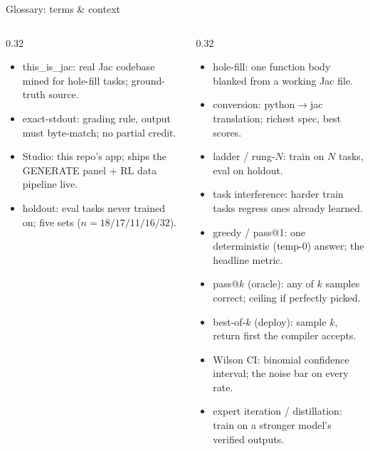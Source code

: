 \documentclass[aspectratio=169,10pt]{beamer}
\newcommand{\term}[1]{\textcolor{jasecidark}{#1}}
\begin{document}
\begin{frame}[t]{Glossary: terms \& context}
\begin{columns}[T]
\begin{column}{0.32\textwidth}
\begin{itemize}
        \item \term{this\_is\_jac}: real Jac codebase mined for hole-fill tasks; ground-truth source.
        \item \term{exact-stdout}: grading rule, output must byte-match; no partial credit.
        \item \term{Studio}: this repo's app; ships the GENERATE panel + RL data pipeline live.
        \item \term{holdout}: eval tasks never trained on; five sets ($n{=}18/17/11/16/32$).
      \end{itemize}
    \end{column}
    \begin{column}{0.32\textwidth}
      \begin{itemize}\itemsep0.15em
        \item \term{hole-fill}: one function body blanked from a working Jac file.
        \item \term{conversion}: python$\rightarrow$jac translation; richest spec, best scores.
        \item \term{ladder / rung-$N$}: train on $N$ tasks, eval on holdout.
        \item \term{task interference}: harder train tasks regress ones already learned.
        \item \term{greedy / pass@1}: one deterministic (temp-0) answer; the headline metric.
        \item \term{pass@$k$ (oracle)}: any of $k$ samples correct; ceiling if perfectly picked.
        \item \term{best-of-$k$ (deploy)}: sample $k$, return first the compiler accepts.
        \item \term{Wilson CI}: binomial confidence interval; the noise bar on every rate.
        \item \term{expert iteration / distillation}: train on a stronger model's verified outputs.
      \end{itemize}
    \end{column}
  \end{columns}
\end{frame}
\end{document}
